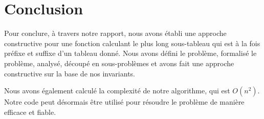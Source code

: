 \section{Conclusion}\label{conclusion}
Pour conclure, à travers notre rapport, nous avons établi une approche
constructive pour une fonction calculant le plus long
sous-tableau qui est à la fois préfixe et suffixe d'un tableau donné. 
Nous avons défini le problème, formalisé le problème, analysé, découpé en 
sous-problèmes et avons fait une approche constructive sur la base de nos invariants.

\vspace{0.4cm}
Nous avons également calculé la complexité de notre algorithme, qui est $O(n^2)$.
Notre code peut désormais être utilisé pour résoudre le problème de manière efficace et
fiable.
